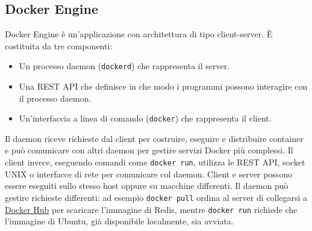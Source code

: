 \subsection{Docker Engine}
Docker Engine è un'applicazione con architettura di tipo client-server. È costituita da tre componenti:
\begin{itemize}
    \item Un processo daemon (\verb|dockerd|) che rappresenta il server.
    \item Una REST API che definisce in che modo i programmi possono interagire con il processo daemon.
    \item Un'interfaccia a linea di comando (\verb|docker|) che rappresenta il client.
\end{itemize}
Il daemon riceve richieste dal client per costruire, eseguire e distribuire container e può comunicare con altri daemon per gestire servizi Docker più complessi. Il client invece, eseguendo comandi come \verb|docker run|, utilizza le REST API, socket UNIX o interfacce di rete per comunicare col daemon. Client e server possono essere eseguiti sullo stesso host oppure su macchine differenti. Il daemon può gestire richieste differenti: ad esempio \verb|docker pull| ordina al server di collegarsi a \hyperref[docker-hub]{Docker Hub} per scaricare l'immagine di Redis, mentre \verb|docker run| richiede che l'immagine di Ubuntu, già disponibile localmente, sia avviata.

